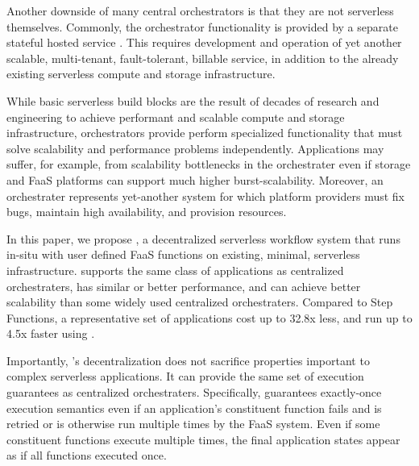 Another downside of many central orchestrators is that they are not serverless themselves.
Commonly, the orchestrator functionality is provided by a separate stateful hosted service
\cite{aws-step-functions, google-cloud-composer, google-workflows}. This requires
development and operation of yet another scalable, multi-tenant, fault-tolerant, 
billable service, in addition to the already existing serverless compute and storage 
infrastructure. 

While basic
serverless build blocks are the result of decades of research and engineering to
achieve performant and scalable compute and storage infrastructure,
orchestrators provide perform specialized functionality that must solve
scalability and performance problems independently. Applications may suffer, for
example, from scalability bottlenecks in the orchestrater even if storage and
FaaS platforms can support much higher burst-scalability. Moreover, an
orchestrater represents yet-another system for which platform providers must fix
bugs, maintain high availability, and provision resources.

In this paper, we propose \name{}, a decentralized serverless workflow system
that runs in-situ with user defined FaaS functions on existing, minimal,
serverless infrastructure. \name{} supports the same class of applications as
centralized orchestraters, has similar or better performance, and can achieve
better scalability than some widely used centralized orchestraters. Compared to
Step Functions, a representative set of applications cost up to 32.8x less, and
run up to 4.5x faster using \name{}.

Importantly, \name{}'s decentralization does not sacrifice properties important
to complex serverless applications. It can provide the same set of execution
guarantees as centralized orchestraters. Specifically, \name{} guarantees
exactly-once execution semantics even if an application's constituent function
fails and is retried or is otherwise run multiple times by the FaaS system.
Even if some constituent functions execute multiple times, the final application
states appear as if all functions executed once.



